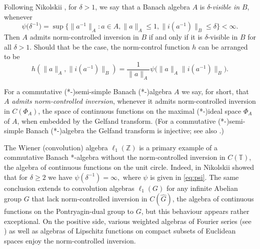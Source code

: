 \documentclass[12pt,fleqn]{amsart}
\theoremstyle{definition}
\numberwithin{equation}{section}
\theoremstyle{remark}
\begin{document}
Following Nikolskii \cite{nikolski1999search}, for $\delta > 1$, we say that a Banach algebra $A$ is $\delta$-\emph{visible in }$B$, whenever 
\begin{equation}\label{eq:psi}
    \psi\big({\delta}^{-1}\big) = \sup\{\|a^{-1}\|_A \colon a\in A, \|a\|_A \leqslant 1, \|i(a^{-1})\|_B \leqslant \delta\}<\infty.
\end{equation}
Then $A$ admits norm-controlled inversion in $B$ if and only if it is $\delta$-visible in $B$ for all $\delta>1$. Should that be the case, the norm-control function $h$ can be arranged to be
%
\begin{equation}\label{eq:control}
    h(\|a\|_A, \|i(a^{-1})\|_B) = \frac{1}{\|a\|_A}\psi\big( {\|a\|_A\|i(a^{-1})\|_B}\big).
\end{equation}

For a commutative (*-)semi-simple Banach (*-)algebra $A$ we say, for short, that $A$ \emph{admits norm-controlled inversion}, whenever it admits norm-controlled inversion in $C(\Phi_A)$, the space of continuous functions on the maximal (*-)ideal space $\Phi_A$ of $A$, when embedded by the Gelfand transform. (For a commutative (*-)semi-simple Banach (*-)algebra the Gelfand transform is injective; see also \cite[Proposition 30.2(ii)]{doran2018characterizations}.)\medskip

{The Wiener (convolution) algebra $\ell_1(\mathbb Z)$ is a primary example of a commutative Banach *-algebra without the norm-controlled inversion in $C(\mathbb T)$, the algebra of continuous functions on the unit circle. Indeed, in \cite{nikolski1999search} Nikolskii showed that for $\delta \geqslant 2$ we have $\psi (\delta^{-1}) = \infty,$ where $\psi$ is given in \eqref{eq:psi}.} The same conclusion extends to convolution algebras $\ell_1(G)$ for any infinite Abelian group $G$ that lack norm-controlled inversion in $C(\widehat{G})$, the algebra of continuous functions on the Pontryagin-dual group to $G$, but this behaviour appears rather exceptional. On the positive side, various weighted algebras of Fourier series (see \cite{el1998estimates}) as well as algebras of Lipschitz functions on compact subsets of Euclidean spaces enjoy the norm-controlled inversion.\smallskip
\end{document}
